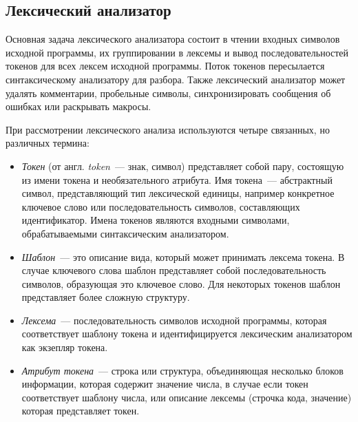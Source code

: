 \subsection{Лексический анализатор} \label{sub112}

Основная задача лексического анализатора состоит в чтении входных символов исходной программы, их группировании в лексемы и вывод последовательностей токенов для всех лексем исходной программы. Поток токенов пересылается синтаксическому анализатору для разбора. Также лексический анализатор может удалять комментарии, пробельные символы, синхронизировать сообщения об ошибках или раскрывать макросы.

При рассмотрении лексического анализа используются четыре связанных, но различных термина:

\begin{itemize} 
	\item{\textit{Токен} (от англ. \textit{token}~--- знак, символ) представляет собой пару, состоящую из имени токена и необязательного атрибута. Имя токена~--- абстрактный символ, представляющий тип лексической единицы, например конкретное ключевое слово или последовательность символов, составляющих идентификатор. Имена токенов являются входными символами, обрабатываемыми синтаксическим анализатором.}
	\item{\textit{Шаблон}~--- это описание вида, который может принимать лексема токена. В случае ключевого слова шаблон представляет собой последовательность символов, образующая это ключевое слово. Для некоторых токенов шаблон представляет более сложную структуру.}
	\item{\textit{Лексема}~--- последовательность символов исходной программы, которая соответствует шаблону токена и идентифицируется лексическим анализатором как экзепляр токена.}
	\item{\textit{Атрибут токена}~--- строка или структура, объединяющая несколько блоков информации, которая содержит значение числа, в случае если токен соответствует шаблону числа, или описание лексемы (строчка кода, значение) которая представляет токен. }
\end{itemize}


